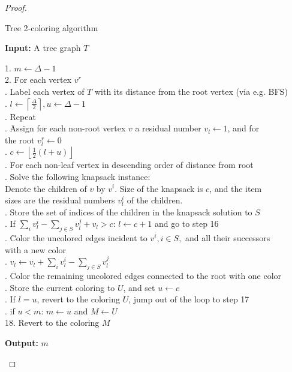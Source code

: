 \documentclass[runningheads, a4paper]{llncs}
\begin{document}
\begin{proof}
\begin{algorithm}[H]
\caption{Tree 2-coloring algorithm}
\label{alg:polytree}
\textbf{Input:} A tree graph $T$
\begin{tabbing}
1. $m \longleftarrow \Delta - 1$ \\
2. \= For each vertex $v^r$ \\
   . Label each vertex of $T$ with its distance from the root vertex (via e.g. BFS) \\
   . $l \longleftarrow \left\lceil \frac{\Delta}{2} \right\rceil, u \longleftarrow \Delta - 1$ \\
   . \= Repeat \\
   \>    . \= Assign for each non-root vertex $v$ a residual number $v_l \longleftarrow 1$, and for \\
   \>    \>    \> the root $v^r_l \longleftarrow 0$ \\
   \>    . $c \longleftarrow \left\lfloor \frac{1}{2}(l+u) \right\rfloor$ \\
   \>    . \= For each non-leaf vertex in descending order of distance from root \\
   \>    \>    . \= Solve the following knapsack instance: \\
   \>    \>    \>    \> Denote the children of $v$ by $v^i$. Size of the knapsack is $c$, and the item \\
   \>    \>    \>    \> sizes are the residual numbers $v_l^i$ of the children. \\
   \>    \>    . Store the set of indices of the children in the knapsack solution to $S$ \\
   \>    \>    . If $\displaystyle\sum_{i} v_l^i - \displaystyle\sum_{j \in S} v_l^j + v_l > c$: $l \longleftarrow c+1$ and go to step 16 \\
   \>    \>    . \= Color the uncolored edges incident to $v^i, i \in S,$ and all their successors \\
   \>    \>    \>    \> with a new color \\
   \>    \>    . $v_l \longleftarrow v_l + \displaystyle\sum_{i} v_l^i - \displaystyle\sum_{j \in S} v_l^j$ \\
   \>    . Color the remaining uncolored edges connected to the root with one color \\
   \>    . Store the current coloring to $U$, and set $u \longleftarrow c$ \\
   \>    . If $l=u$, revert to the coloring $U$, jump out of the loop to step 17 \\
   . if $u < m$: $m \longleftarrow u$ and $M \longleftarrow U$ \\
18. Revert to the coloring $M$ \\
\end{tabbing}
\textbf{Output:} $m$
\end{algorithm}


\end{proof}
\end{document}
